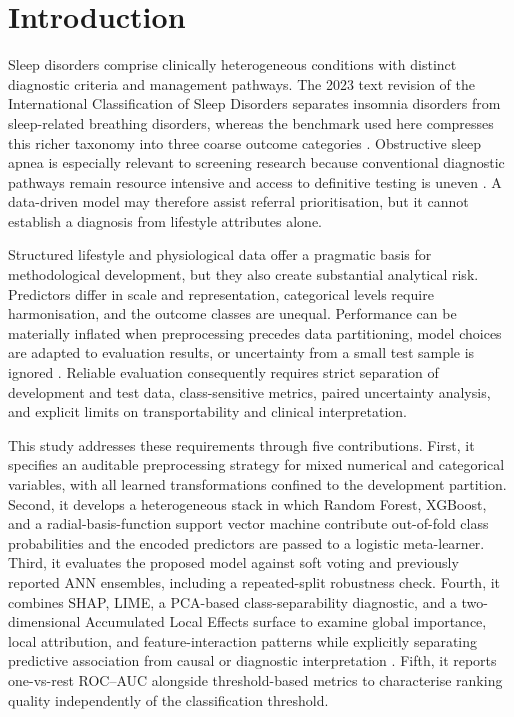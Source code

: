 \documentclass{elektr}
\begin{document}
\section{Introduction}
Sleep disorders comprise clinically heterogeneous conditions with distinct diagnostic criteria and management pathways. The 2023 text revision of the International Classification of Sleep Disorders separates insomnia disorders from sleep-related breathing disorders, whereas the benchmark used here compresses this richer taxonomy into three coarse outcome categories \cite{aasm2023}. Obstructive sleep apnea is especially relevant to screening research because conventional diagnostic pathways remain resource intensive and access to definitive testing is uneven \cite{korkalainen2024,giorgi2025,bazoukis2023}. A data-driven model may therefore assist referral prioritisation, but it cannot establish a diagnosis from lifestyle attributes alone.

Structured lifestyle and physiological data offer a pragmatic basis for methodological development, but they also create substantial analytical risk. Predictors differ in scale and representation, categorical levels require harmonisation, and the outcome classes are unequal. Performance can be materially inflated when preprocessing precedes data partitioning, model choices are adapted to evaluation results, or uncertainty from a small test sample is ignored \cite{kapoor2023,efthimiou2024,collins2024}. Reliable evaluation consequently requires strict separation of development and test data, class-sensitive metrics, paired uncertainty analysis, and explicit limits on transportability and clinical interpretation.

This study addresses these requirements through five contributions. First, it specifies an auditable preprocessing strategy for mixed numerical and categorical variables, with all learned transformations confined to the development partition. Second, it develops a heterogeneous stack in which Random Forest, XGBoost, and a radial-basis-function support vector machine contribute out-of-fold class probabilities and the encoded predictors are passed to a logistic meta-learner. Third, it evaluates the proposed model against soft voting and previously reported ANN ensembles, including a repeated-split robustness check. Fourth, it combines SHAP, LIME, a PCA-based class-separability diagnostic, and a two-dimensional Accumulated Local Effects surface to examine global importance, local attribution, and feature-interaction patterns while explicitly separating predictive association from causal or diagnostic interpretation \cite{jung2023,allen2024,pesapane2026}. Fifth, it reports one-vs-rest ROC--AUC alongside threshold-based metrics to characterise ranking quality independently of the classification threshold.
\end{document}

